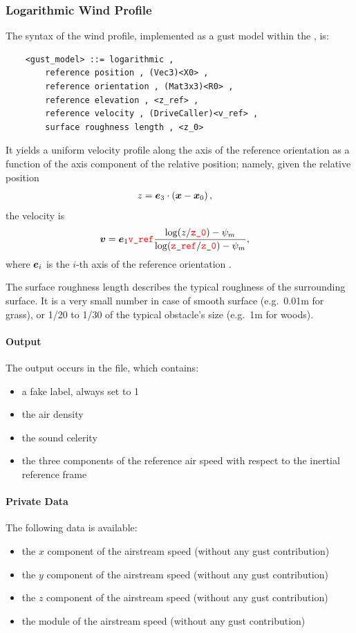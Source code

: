 \subsubsection{Logarithmic Wind Profile}
The syntax of the  wind profile, implemented as a gust model
within the , is:
\begin{verbatim}
    <gust_model> ::= logarithmic ,
        reference position , (Vec3)<X0> ,
        reference orientation , (Mat3x3)<R0> ,
        reference elevation , <z_ref> ,
        reference velocity , (DriveCaller)<v_ref> ,
        surface roughness length , <z_0>
\end{verbatim}
It yields a uniform velocity profile along the  axis of the
reference orientation as a function of the  axis component
of the relative position; namely, given the relative position
\begin{align}
	z &= \boldsymbol{e}_3 \cdot \left( \boldsymbol{x} - \boldsymbol{x}_0 \right)
	,
\end{align}
the velocity is
\begin{align}
	\boldsymbol{v}
	&=
	\boldsymbol{e}_1 \textcolor{red}{\texttt{v\_ref}} \frac{
		\log(z/\textcolor{red}{\texttt{z\_0}}) - \psi_m
	}{
		\log(\textcolor{red}{\texttt{z\_ref}}/\textcolor{red}{\texttt{z\_0}}) - \psi_m
	}
	,
\end{align}
where $\boldsymbol{e}_i$ is the $i$-th axis of the reference orientation .

The surface roughness length describes the typical roughness
of the surrounding surface.
It is a very small number in case of smooth surface
(e.g.\ 0.01m for grass),
or 1/20 to 1/30 of the typical obstacle's size (e.g.\ 1m for woods).


\paragraph{Output}
The output occurs in the  file, which contains:
\begin{itemize}
\item a fake label, always set to 1
\item the air density
\item the sound celerity
\item the three components of the reference air speed
with respect to the inertial reference frame
\end{itemize}


\paragraph{Private Data}
The following data is available:
\begin{itemize}
\item {} the $x$ component of the airstream speed (without any gust contribution)
\item {} the $y$ component of the airstream speed (without any gust contribution)
\item {} the $z$ component of the airstream speed (without any gust contribution)
\item {} the module of the airstream speed (without any gust contribution)
\end{itemize}

